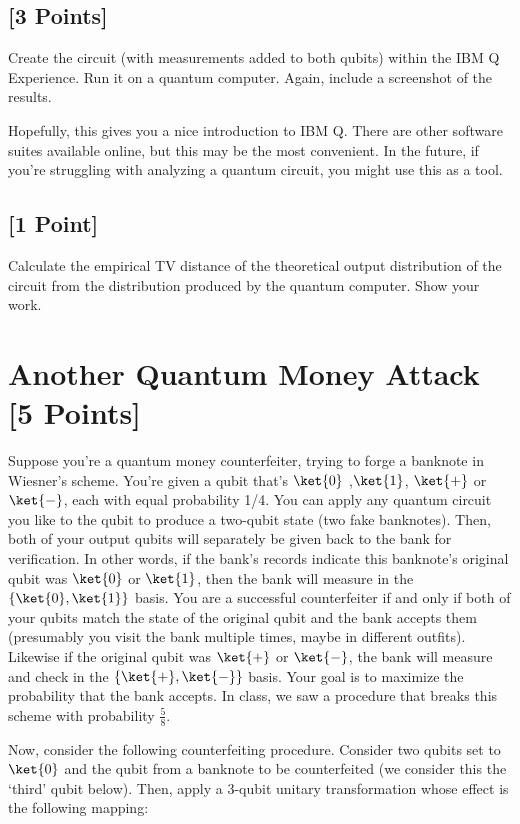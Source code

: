 \documentclass[11pt]{article}
\begin{document}
\subsection{[3 Points]} Create the circuit (with measurements added to both qubits) within the IBM Q Experience. Run it on a quantum computer. Again, include a screenshot of the results.

Hopefully, this gives you a nice introduction to IBM Q. There are other software suites available online, but this may be the most convenient. In the future, if you're struggling with analyzing a quantum circuit, you might use this as a tool.

\subsection{[1 Point]}
Calculate the empirical TV distance of the theoretical output distribution of the circuit from the distribution produced by the quantum computer. Show your work.


\section{Another Quantum Money Attack [5 Points]} 
Suppose you're a quantum money counterfeiter, trying to forge a banknote in Wiesner's scheme.  You're given a qubit that's $\ket{0}$ ,$\ket{1}$, $\ket{+}$ or $\ket{-}$, each with equal probability 1/4.  You can apply any quantum circuit you like to the qubit to produce a two-qubit state (two fake banknotes). Then, both of your output qubits will separately be given back to the bank for verification. 
In other words, if the bank's records indicate this banknote's original qubit was $\ket{0}$ or $\ket{1}$, then the bank will measure in the $ \{\ket{0},\ket{1}\} $ basis. You are a successful counterfeiter if and only if both of your qubits match the state of the original qubit and the bank accepts them (presumably you visit the bank multiple times, maybe in different outfits). Likewise if the original qubit was $\ket{+}$ or $\ket{-}$, the bank will measure and check in the $\{ \ket{+},\ket{-} \}$ basis.  
Your goal is to maximize the probability that the bank accepts.
In class, we saw a procedure that breaks this scheme with probability $\frac{5}{8}$. 

Now, consider the following counterfeiting procedure. 
Consider two qubits set to $\ket{0}$ and the qubit from a banknote to be counterfeited (we consider this the `third' qubit below). Then, apply a 3-qubit unitary transformation whose effect is the following mapping:
\end{document}
